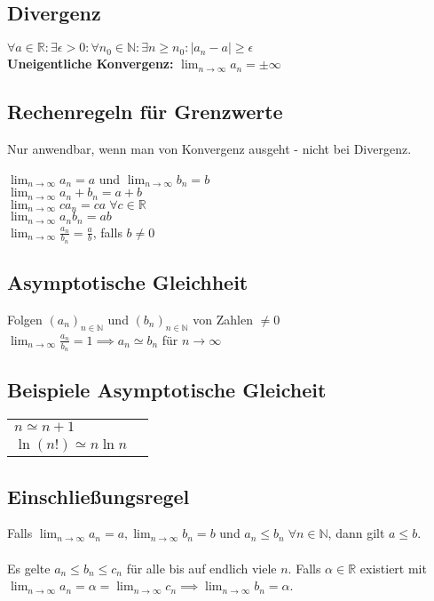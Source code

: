 \documentclass[a4paper,9pt]{extarticle}
\newcommand{\liminfty}[1][n]{\lim_{#1 \to \infty}}
\begin{document}
	\subsection*{Divergenz}

	$ \forall a \in \mathbb{R}: \exists \epsilon > 0: \forall n_0 \in \mathbb{N}: \exists n \ge n_0: |a_n -a| \ge \epsilon $ \\
	\textbf{Uneigentliche Konvergenz:}
		$\liminfty{a_n} = \pm ∞$
	
	
	\subsection*{Rechenregeln für Grenzwerte}

	Nur anwendbar, wenn man von Konvergenz ausgeht - nicht bei Divergenz.
	
	$ \liminfty{a_n} = a $ und $ \liminfty{b_n} = b $ \\
	$ \liminfty{a_n + b_n} = a + b $ \\
	$ \liminfty{c a_n} = c a \; \forall c \in \mathbb{R} $ \\
	$ \liminfty{a_n b_n} = a b $ \\
	$ \liminfty{\frac{a_n}{b_n}} = \frac{a}{b} $, falls $b \neq 0$
	
	
	\subsection*{Asymptotische Gleichheit}
	
	Folgen $(a_n)_{n \in \mathbb{N}}$ und $(b_n)_{n \in \mathbb{N}}$ von Zahlen $\neq 0$ \\
	$\liminfty{\frac{a_n}{b_n}} = 1 \implies a_n \simeq b_n$ für $n \to \infty $


	\subsection*{Beispiele Asymptotische Gleicheit} %

	\begin{tabular}{ll}
		$ n \simeq n + 1 $ \\
		$ \ln (n!) \simeq n \ln n$ \\
	\end{tabular}
	
	\subsection*{Einschließungsregel}

	Falls $ \liminfty{a_n} = a, \liminfty{b_n} = b $ und $a_n \le b_n \; \forall n \in \mathbb{N}$, dann gilt $a \le b$. \\ \\
	Es gelte $a_n \le b_n \le c_n$ für alle bis auf endlich viele $n$.
	Falls $\alpha \in \mathbb{R}$ existiert mit $ \liminfty{a_n} = \alpha = \liminfty{c_n} \implies \liminfty{b_n} = \alpha$.
\end{document}
